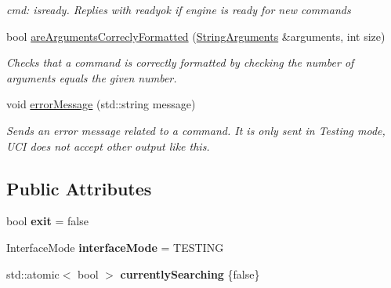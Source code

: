 \begin{DoxyCompactItemize}
\begin{DoxyCompactList}\small\item\em cmd\+: isready. Replies with readyok if engine is ready for new commands \end{DoxyCompactList}\item 
\mbox{\label{classCommandEngine_a6c4da85ce98949d0b12abe5913397a65}} 
bool \hyperlink{classCommandEngine_a6c4da85ce98949d0b12abe5913397a65}{are\+Arguments\+Correcly\+Formatted} (\hyperlink{structStringArguments}{String\+Arguments} \&arguments, int size)
\begin{DoxyCompactList}\small\item\em Checks that a command is correctly formatted by checking the number of arguments equals the given number. \end{DoxyCompactList}\item 
\mbox{\label{classCommandEngine_a7a8ea24982fe014a3d0518fabb9fba5c}} 
void \hyperlink{classCommandEngine_a7a8ea24982fe014a3d0518fabb9fba5c}{error\+Message} (std\+::string message)
\begin{DoxyCompactList}\small\item\em Sends an error message related to a command. It is only sent in Testing mode, U\+CI does not accept other output like this. \end{DoxyCompactList}\end{DoxyCompactItemize}
\subsection*{Public Attributes}
\begin{DoxyCompactItemize}
\item 
\mbox{\label{classCommandEngine_ab046274e8d4cf871fd392aafd7e37214}} 
bool {\bfseries exit} = false
\item 
\mbox{\label{classCommandEngine_aa7b5bb7e6195276e5bc77d5335fc749f}} 
Interface\+Mode {\bfseries interface\+Mode} = T\+E\+S\+T\+I\+NG
\item 
\mbox{\label{classCommandEngine_a6d7699fde08924a6dc99516948d1c7ca}} 
std\+::atomic$<$ bool $>$ {\bfseries currently\+Searching} \{false\}
\end{DoxyCompactItemize}


